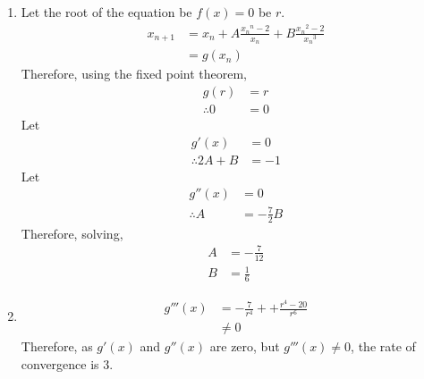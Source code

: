\documentclass[fleqn, a4paper, 11pt, oneside]{amsart}
\theoremstyle{definition}
\theoremstyle{theorem}
\begin{document}
\begin{solution}
	\begin{enumerate}[leftmargin=*]
		\item
			Let the root of the equation be $f(x) = 0$ be $r$.
			\begin{align*}
				x_{n + 1} & = x_n + A \frac{{x_n}^n - 2}{x_n} + B \frac{{x_n}^2 - 2}{{x_n}^3} \\
                                          & = g(x_n)
			\end{align*}
			Therefore, using the fixed point theorem,
			\begin{align*}
				g(r)         & = r \\
				\therefore 0 & = 0
			\end{align*}
			Let
			\begin{align*}
				g'(x)              & = 0 \\
				\therefore 2 A + B & = -1
			\end{align*}
			Let
			\begin{align*}
				g''(x)       & = 0 \\
				\therefore A & = -\frac{7}{2} B
			\end{align*}
			Therefore, solving,
			\begin{align*}
				A & = -\frac{7}{12} \\
				B & = \frac{1}{6}
			\end{align*}
		\item
			\begin{align*}
				g'''(x) & = -\frac{7}{r^4} + + \frac{r^4 - 20}{r^6} \\
                                        & \neq 0
			\end{align*}
			Therefore, as $g'(x)$ and $g''(x)$ are zero, but $g'''(x) \neq 0$, the rate of convergence is $3$.
	\end{enumerate}
\end{solution}
\end{document}
